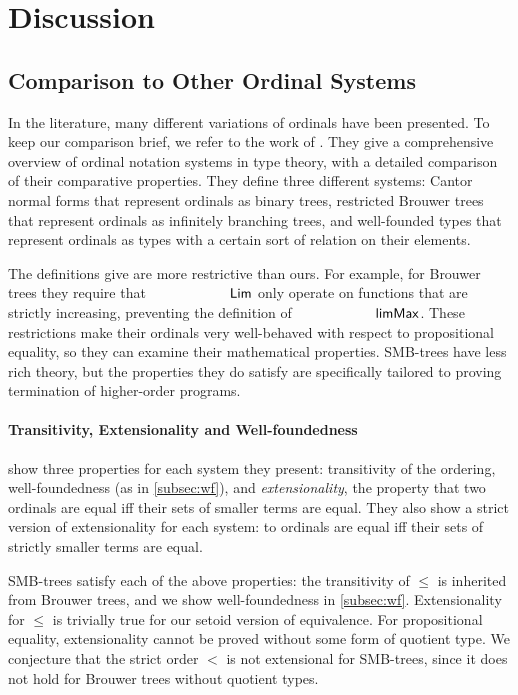 
\section{Discussion}
\label{sec:discussion}

\subsection{Comparison to Other Ordinal Systems}

In the literature, many different variations of ordinals have been presented.
To keep our comparison brief, we refer to the work of
\citet{KRAUS2023113843}.
They give a comprehensive overview
of ordinal notation systems in type theory, with a detailed
comparison of their comparative properties.
They define three different systems: Cantor normal forms
that represent ordinals as binary trees, restricted Brouwer trees that represent
ordinals as infinitely branching trees, and well-founded types
that represent ordinals as types with a certain sort of relation on
their elements.


The definitions \citeauthor{KRAUS2023113843} give are more restrictive than
ours. For example, for Brouwer trees they require that $\Lim$ only operate
on functions that are strictly increasing, preventing
the definition of $\limMax$. These restrictions
make their ordinals very well-behaved with respect to propositional equality,
so they can
examine their mathematical properties.
SMB-trees have less rich theory, but the properties
they do satisfy are specifically tailored to proving
termination of higher-order programs.

\paragraph{Transitivity, Extensionality and Well-foundedness}
 show three properties for each system they present:
transitivity of the ordering, well-foundedness (as in \cref{subsec:wf}),
and \textit{extensionality}, the property that two ordinals are equal
iff their sets of smaller terms are equal. They also show a strict version
of extensionality for each system: to ordinals are equal iff their sets of
strictly smaller terms are equal.

SMB-trees satisfy each of the above properties: the transitivity of $\le$
is inherited from Brouwer trees, and we show well-foundedness in \cref{subsec:wf}.
Extensionality for $\le$ is trivially true for our setoid version of equivalence.
For propositional equality, extensionality cannot be proved without some form of quotient type.
We conjecture that the strict order $<$  is not extensional for SMB-trees,
since it does not hold for Brouwer trees without quotient types.


